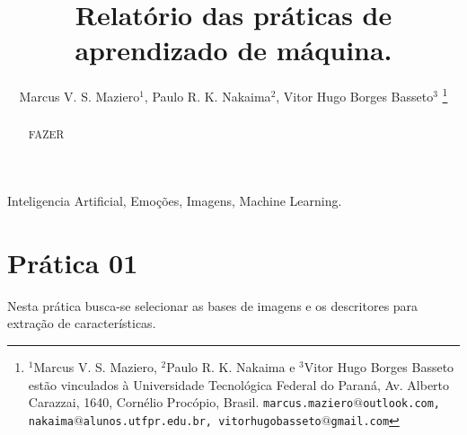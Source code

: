 \documentclass[a4paper, 12 pt, conference]{ieeeconf}  %
\title{\LARGE \bf
Relatório das práticas de aprendizado de máquina.
}
\author{Marcus V. S. Maziero$^{1}$, Paulo R. K. Nakaima$^{2}$, Vitor Hugo Borges Basseto$^{3}$%
\thanks{$^{1}$Marcus V. S. Maziero, $^{2}$Paulo R. K. Nakaima e $^{3}$Vitor Hugo Borges Basseto estão vinculados à Universidade Tecnológica Federal do Paraná, Av. Alberto Carazzai, 1640, Cornélio Procópio, Brasil. 
        {\tt\small marcus.maziero$@$outlook.com, nakaima$@$alunos.utfpr.edu.br, vitorhugobasseto$@$gmail.com}}%
}
\begin{document}
\maketitle
\thispagestyle{empty}
\pagestyle{empty}


\begin{abstract}
	FAZER
\end{abstract}

\begin{keywords}
	Inteligencia Artificial, Emoções, Imagens, Machine Learning.
\end{keywords}


%
%
%
%

\section{Prática 01}
\label{pratica01}
Nesta prática busca-se selecionar as bases de imagens e os descritores para extração de características.
\end{document}
